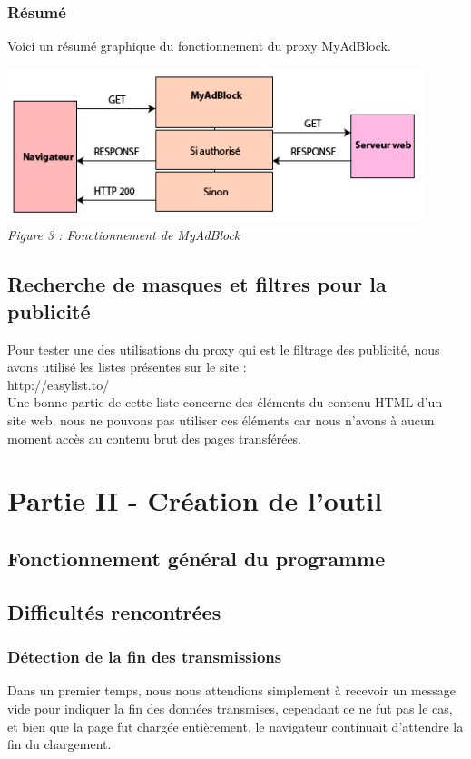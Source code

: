 \documentclass{scrreprt}
\begin{document}
\subsection{Résumé}
Voici un résumé graphique du fonctionnement du proxy MyAdBlock.

\begin{center}
  \includegraphics[height=4.5cm]{images/f3.png}
  \\
  \textit{Figure 3 : Fonctionnement de MyAdBlock}
\end{center}


\section{Recherche de masques et filtres pour la publicité}
Pour tester une des utilisations du proxy qui est le filtrage des publicité, nous avons utilisé les listes présentes sur le site :\\
http://easylist.to/\\
Une bonne partie de cette liste concerne des éléments du contenu HTML d'un site web, nous ne pouvons pas utiliser ces éléments car nous n'avons à aucun moment accès au contenu brut des pages transférées.

\chapter{Partie II - Création de l'outil}

\section{Fonctionnement général du programme}

\section{Difficultés rencontrées}

\subsection{Détection de la fin des transmissions}
Dans un premier temps, nous nous attendions simplement à recevoir un message vide pour indiquer la fin des données transmises, cependant ce ne fut pas le cas, et bien que la page fut chargée entièrement, le navigateur continuait d'attendre la fin du chargement.\\
[GUILLAUME]
\end{document}
